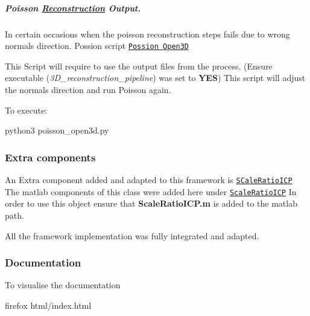 \subparagraph*{Poisson \hyperlink{classReconstruction}{Reconstruction} Output.}

In certain occasions when the poisson reconstruction steps fails due to wrong normals direction. Possion script \href{https://github.com/esteban-andrade/3D-Reconstructrion-Scanner/blob/main/poisson_open3d.py}{\tt Possion Open3D}

This Script will require to use the output files from the process. (Ensure executable ({\itshape 3\+D\+\_\+reconstruction\+\_\+pipeline}) was set to {\bfseries Y\+ES}) This script will adjust the normals direction and run Poisson again.

To execute\+:


\begin{DoxyCode}
python3 poisson\_open3d.py
\end{DoxyCode}


\subsubsection*{Extra components}

An Extra component added and adapted to this framework is \href{https://github.com/linbaowei/ScaleRatioICP}{\tt S\+Cale\+Ratio\+I\+CP} The matlab components of this class were added here under \href{https://github.com/esteban-andrade/3D-Reconstructrion-Scanner}{\tt Scale\+Ratio\+I\+CP} In order to use this object ensure that {\bfseries Scale\+Ratio\+I\+C\+P.\+m} is added to the matlab path.

All the framework implementation was fully integrated and adapted.

\subsubsection*{Documentation}

To visualise the documentation


\begin{DoxyCode}
firefox html/index.html 
\end{DoxyCode}
 